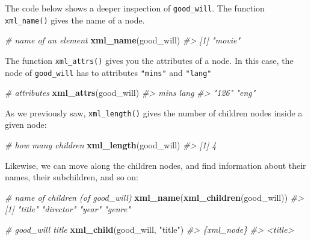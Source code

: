 \documentclass[
]{book}
\newenvironment{Shaded}{\begin{snugshade}}{\end{snugshade}}
\newcommand{\CommentTok}[1]{\textcolor[rgb]{0.56,0.35,0.01}{\textit{#1}}}
\newcommand{\FunctionTok}[1]{\textcolor[rgb]{0.13,0.29,0.53}{\textbf{#1}}}
\newcommand{\NormalTok}[1]{#1}
\newcommand{\StringTok}[1]{\textcolor[rgb]{0.31,0.60,0.02}{#1}}
\begin{document}
The code below shows a deeper inspection of \texttt{good\_will}. The function
\texttt{xml\_name()} gives the name of a node.

\begin{Shaded}
\begin{Highlighting}[]
\CommentTok{\# name of an element}
\FunctionTok{xml\_name}\NormalTok{(good\_will)}
\CommentTok{\#\textgreater{} [1] "movie"}
\end{Highlighting}
\end{Shaded}

The function \texttt{xml\_attrs()} gives you the attributes of a node. In this case,
the node of \texttt{good\_will} has to attributes \texttt{"mins"} and \texttt{"lang"}

\begin{Shaded}
\begin{Highlighting}[]
\CommentTok{\# attributes}
\FunctionTok{xml\_attrs}\NormalTok{(good\_will)}
\CommentTok{\#\textgreater{}  mins  lang }
\CommentTok{\#\textgreater{} "126" "eng"}
\end{Highlighting}
\end{Shaded}

As we previously saw, \texttt{xml\_length()} gives the number of children nodes inside
a given node:

\begin{Shaded}
\begin{Highlighting}[]
\CommentTok{\# how many children}
\FunctionTok{xml\_length}\NormalTok{(good\_will)}
\CommentTok{\#\textgreater{} [1] 4}
\end{Highlighting}
\end{Shaded}

Likewise, we can move along the children nodes, and find information about
their names, their subchildren, and so on:

\begin{Shaded}
\begin{Highlighting}[]
\CommentTok{\# name of children (of good\_will)}
\FunctionTok{xml\_name}\NormalTok{(}\FunctionTok{xml\_children}\NormalTok{(good\_will))}
\CommentTok{\#\textgreater{} [1] "title"    "director" "year"     "genre"}

\CommentTok{\# good\_will title}
\FunctionTok{xml\_child}\NormalTok{(good\_will, }\StringTok{"title"}\NormalTok{)}
\CommentTok{\#\textgreater{} \{xml\_node\}}
\CommentTok{\#\textgreater{} \textless{}title\textgreater{}}
\end{Highlighting}
\end{Shaded}
\end{document}
